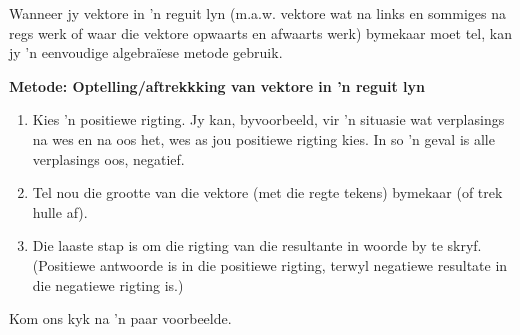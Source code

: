 Wanneer jy vektore in  'n reguit lyn (m.a.w. vektore wat na links en sommiges na regs werk of waar die vektore opwaarts en afwaarts werk) bymekaar moet tel, kan jy  'n eenvoudige algebraïese metode gebruik.\\

\begin{minipage}{\textwidth}
\textbf{Metode: Optelling/aftrekkking van vektore in  'n reguit lyn}
\begin{enumerate}[noitemsep, label=\textbf{\arabic*}.]
\item{Kies  'n positiewe rigting. Jy kan, byvoorbeeld, vir  'n situasie wat verplasings na wes en na oos het, wes as jou positiewe rigting kies. In so  'n geval is alle verplasings oos, negatief.}
\item{Tel nou die grootte van die vektore (met die regte tekens) bymekaar (of trek hulle af).}
\item{Die laaste stap is om die rigting van die resultante in woorde by te skryf. (Positiewe antwoorde is in die positiewe rigting, terwyl negatiewe resultate in die negatiewe rigting is.)}\\
\end{enumerate}
\end{minipage}

Kom ons kyk na  'n paar voorbeelde.


